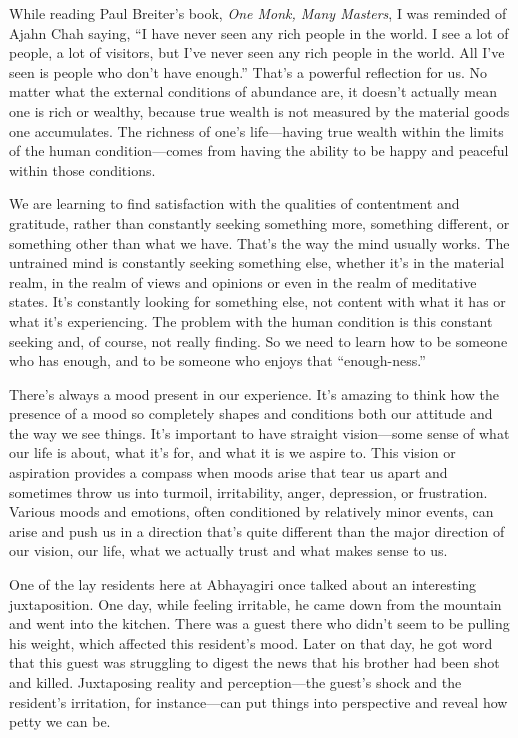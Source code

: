 While reading Paul Breiter's book, \emph{One Monk, Many Masters}, I was 
reminded of Ajahn Chah saying, ``I have never seen any rich people in 
the world. I see a lot of people, a lot of visitors, but I've never 
seen any rich people in the world. All I've seen is people who don't 
have enough.'' That's a powerful reflection for us. No matter what the 
external conditions of abundance are, it doesn't actually mean one is 
rich or wealthy, because true wealth is not measured by the material 
goods one accumulates. The richness of one's life---having true wealth 
within the limits of the human condition---comes from having the 
ability to be happy and peaceful within those conditions.

We are learning to find satisfaction with the qualities of contentment 
and gratitude, rather than constantly seeking something more, something 
different, or something other than what we have. That's the way the 
mind usually works. The \mbox{untrained} mind is constantly seeking something 
else, whether it's in the material realm, in the realm of views and 
opinions or even in the realm of meditative states. It's constantly 
looking for something else, not content with what it has or what it's 
experiencing. The problem with the human condition is this constant 
seeking and, of course, not really finding. So we need to learn how to 
be someone who has enough, and to be someone who enjoys that 
``enough-ness.''


There's always a mood present in our experience. It's amazing to think 
how the presence of a mood so completely shapes and conditions both our 
attitude and the way we see things. It's important to have straight 
vision---some sense of what our life is about, what it's for, and what 
it is we aspire to. This vision or aspiration provides a compass when 
moods arise that tear us apart and sometimes throw us into turmoil, 
irritability, anger, depression, or frustration. Various moods and 
emotions, often conditioned by relatively minor events, can arise and 
push us in a direction that's quite different than the major direction 
of our vision, our life, what we actually trust and what makes sense to 
us.

One of the lay residents here at Abhayagiri once talked about an 
interesting juxtaposition. One day, while feeling irritable, he came 
down from the mountain and went into the kitchen. There was a guest 
there who didn't seem to be pulling his weight, which affected this 
resident's mood. Later on that day, he got word that this guest was 
struggling to digest the news that his brother had been shot and 
killed. Juxtaposing reality and perception---the guest's shock and the 
resident's irritation, for instance---can put things into perspective 
and reveal how petty we can be.

